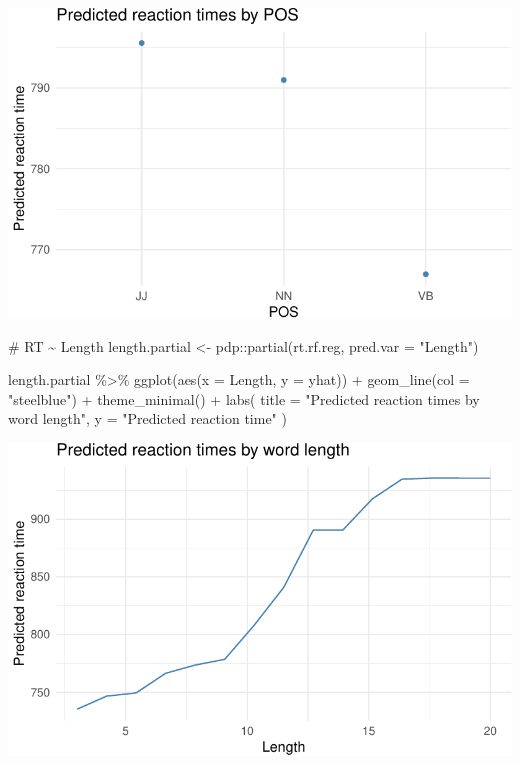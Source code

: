 \documentclass[
  11pt,
  letterpaper,
  DIV=11,
  numbers=noendperiod]{scrreprt}
\newenvironment{Shaded}{\begin{snugshade}}{\end{snugshade}}
\newcommand{\AttributeTok}[1]{\textcolor[rgb]{0.40,0.45,0.13}{#1}}
\newcommand{\CommentTok}[1]{\textcolor[rgb]{0.37,0.37,0.37}{#1}}
\newcommand{\FunctionTok}[1]{\textcolor[rgb]{0.28,0.35,0.67}{#1}}
\newcommand{\NormalTok}[1]{\textcolor[rgb]{0.00,0.23,0.31}{#1}}
\newcommand{\OtherTok}[1]{\textcolor[rgb]{0.00,0.23,0.31}{#1}}
\newcommand{\SpecialCharTok}[1]{\textcolor[rgb]{0.37,0.37,0.37}{#1}}
\newcommand{\StringTok}[1]{\textcolor[rgb]{0.13,0.47,0.30}{#1}}
\begin{document}
\includegraphics{Decision_trees_and_random_forests_files/figure-pdf/unnamed-chunk-11-2.pdf}

\begin{Shaded}
\begin{Highlighting}[]
\CommentTok{\# RT \textasciitilde{} Length}
\NormalTok{length.partial }\OtherTok{\textless{}{-}}\NormalTok{ pdp}\SpecialCharTok{::}\FunctionTok{partial}\NormalTok{(rt.rf.reg, }\AttributeTok{pred.var =} \StringTok{"Length"}\NormalTok{)}

\NormalTok{length.partial }\SpecialCharTok{\%\textgreater{}\%} 
  \FunctionTok{ggplot}\NormalTok{(}\FunctionTok{aes}\NormalTok{(}\AttributeTok{x =}\NormalTok{ Length, }\AttributeTok{y =}\NormalTok{ yhat)) }\SpecialCharTok{+}
  \FunctionTok{geom\_line}\NormalTok{(}\AttributeTok{col =} \StringTok{"steelblue"}\NormalTok{) }\SpecialCharTok{+}
  \FunctionTok{theme\_minimal}\NormalTok{() }\SpecialCharTok{+}
  \FunctionTok{labs}\NormalTok{(}
    \AttributeTok{title =} \StringTok{"Predicted reaction times by word length"}\NormalTok{,}
    \AttributeTok{y =} \StringTok{"Predicted reaction time"}
\NormalTok{  )}
\end{Highlighting}
\end{Shaded}

\includegraphics{Decision_trees_and_random_forests_files/figure-pdf/unnamed-chunk-11-3.pdf}
\end{document}
